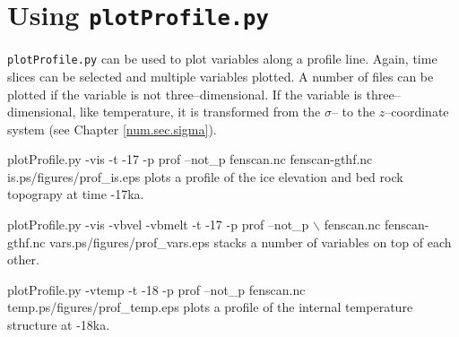 \section{Using \texttt{plotProfile.py}}
\texttt{plotProfile.py} can be used to plot variables along a profile line. Again, time slices can be selected and multiple variables plotted. A number of files can be plotted if the variable is not three--dimensional. If the variable is three--dimensional, like temperature, it is transformed from the $\sigma$-- to the $z$--coordinate system (see Chapter \ref{num.sec.sigma}).

\begin{pycf}{plotProfile.py -vis  -t -17 -p prof --not\_p fenscan.nc fenscan-gthf.nc is.ps}{\dir/figures/prof_is.eps}
  plots a profile of the ice elevation and bed rock topograpy at time -17ka.
\end{pycf}

\begin{pycf}{plotProfile.py -vis -vbvel -vbmelt -t -17 -p prof --not\_p $\backslash$ \newline   fenscan.nc fenscan-gthf.nc vars.ps}{\dir/figures/prof_vars.eps}
  stacks a number of variables on top of each other.
\end{pycf}

\begin{pycf}{plotProfile.py -vtemp  -t -18 -p prof --not\_p fenscan.nc temp.ps}{\dir/figures/prof_temp.eps}
  plots a profile of the internal temperature structure at -18ka.
\end{pycf}
